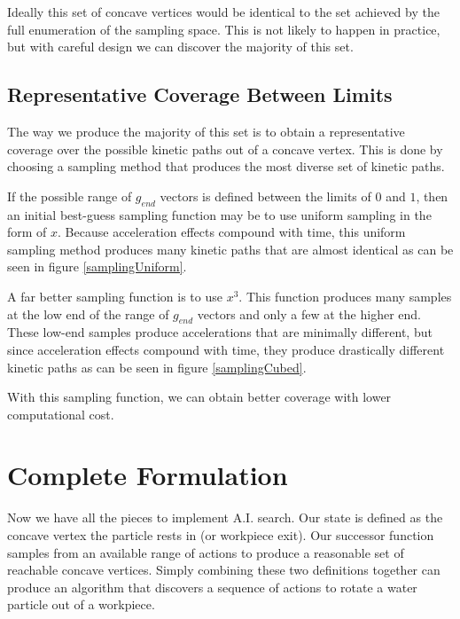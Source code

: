 Ideally this set of concave vertices would be identical to the set achieved by the full enumeration of the sampling space. This is not likely to happen in practice, but with careful design we can discover the majority of this set.

	\subsection{Representative Coverage Between Limits}

The way we produce the majority of this set is to obtain a representative coverage over the possible kinetic paths out of a concave vertex. This is done by choosing a sampling method that produces the most diverse set of kinetic paths.

If the possible range of $g_{end}$ vectors is defined between the limits of $0$ and $1$, then an initial best-guess sampling function may be to use uniform sampling in the form of $x$. Because acceleration effects compound with time, this uniform sampling method produces many kinetic paths that are almost identical as can be seen in figure \ref{samplingUniform}.


A far better sampling function is to use $x^3$. This function produces many samples at the low end of the range of $g_{end}$ vectors and only a few at the higher end. These low-end samples produce accelerations that are minimally different, but since acceleration effects compound with time, they produce drastically different kinetic paths as can be seen in figure \ref{samplingCubed}.


With this sampling function, we can obtain better coverage with lower computational cost.

	\section{Complete Formulation}

Now we have all the pieces to implement A.I. search. Our state is defined as the concave vertex the particle rests in (or workpiece exit). Our successor function samples from an available range of actions to produce a reasonable set of reachable concave vertices. Simply combining these two definitions together can produce an algorithm that discovers a sequence of actions to rotate a water particle out of a workpiece.

